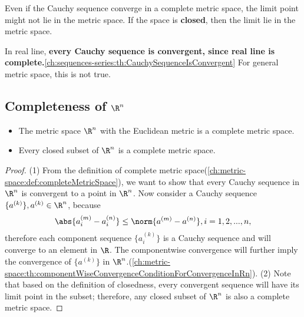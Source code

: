 \begin{refsection}
\begin{remark}
Even if the Cauchy sequence converge in a complete metric space, the limit point might not lie in the metric space. If the space is \textbf{closed}, then the limit lie in the metric space.
\end{remark}





\begin{remark}
In real line, \textbf{every Cauchy sequence is convergent, since real line is complete.}\autoref{ch:sequences-series:th:CauchySequenceIsConvergent} For general metric space, this is not true. 
\end{remark}



\subsection{Completeness of $\R^n$}


\begin{theorem}\cite[323]{fitzpatrick2006advanced}\label{ch:metric-space:th:CompletenessOfRnWithEuclideanMetric}\hfill
\begin{itemize}
	\item The metric space $\R^n$ with the Euclidean metric is a complete metric space.
	\item Every closed subset of $\R^n$ is a complete metric space.
\end{itemize}	
\end{theorem}
\begin{proof}
(1)	From the definition of complete metric space(\autoref{ch:metric-space:def:completeMetricSpace}), we want to show that every Cauchy sequence in $\R^n$ is convergent to a point in $\R^n$. Now consider a Cauchy sequence $\{a^{(k)}\},a^{(k)}\in \R^n$, because
$$\abs{a^{(m)}_i - a^{(n)}_i} \leq \norm{a^{(m)} - a^{(n)}},i=1,2,...,n,$$
therefore each component sequence $\{a^{(k)}_i\}$ is a Cauchy sequence and will converge to an element in $\R$. The componentwise convergence will further imply the convergence of $\{a^{(k)}\}$ in $\R^n$.(\autoref{ch:metric-space:th:componentWiseConvergenceConditionForConvergenceInRn}). 
(2) Note that based on the definition of closedness, every convergent sequence will have its limit point in the subset; therefore, any closed subset of $\R^n$ is also a complete metric space.
\end{proof}







\end{refsection}
